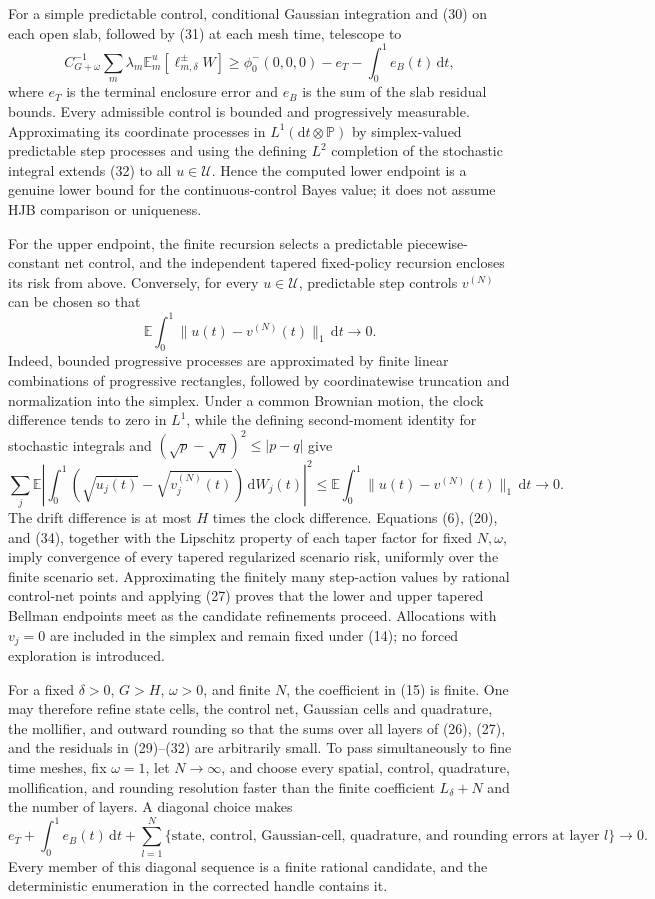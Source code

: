 For a simple predictable control, conditional Gaussian integration and (30) on each open slab, followed by (31) at each mesh time, telescope to
\[
 C_{G+\omega}^{-1}\sum_m\lambda_m
 \mathbb E_m^u[\ell_{m,\delta}^\pm W]
 \geq \phi_0^-(0,0,0)-e_T-\int_0^1e_B(t)\,\mathrm dt,
 \tag{32}
\]
where \(e_T\) is the terminal enclosure error and \(e_B\) is the sum of the slab residual bounds.  Every admissible control is bounded and progressively measurable.  Approximating its coordinate processes in \(L^1(\mathrm dt\otimes\mathbb P)\) by simplex-valued predictable step processes and using the defining \(L^2\) completion of the stochastic integral extends (32) to all \(u\in\mathcal U\).  Hence the computed lower endpoint is a genuine lower bound for the continuous-control Bayes value; it does not assume HJB comparison or uniqueness.

For the upper endpoint, the finite recursion selects a predictable piecewise-constant net control, and the independent tapered fixed-policy recursion encloses its risk from above.  Conversely, for every \(u\in\mathcal U\), predictable step controls \(v^{(N)}\) can be chosen so that
\[
 \mathbb E\int_0^1\|u(t)-v^{(N)}(t)\|_1\,\mathrm dt\longrightarrow0.
 \tag{33}
\]
Indeed, bounded progressive processes are approximated by finite linear combinations of progressive rectangles, followed by coordinatewise truncation and normalization into the simplex.  Under a common Brownian motion, the clock difference tends to zero in \(L^1\), while the defining second-moment identity for stochastic integrals and \((\sqrt p-\sqrt q)^2\leq|p-q|\) give
\[
 \sum_j\mathbb E\left|
 \int_0^1(\sqrt{u_j(t)}-\sqrt{v_j^{(N)}(t)})\,\mathrm dW_j(t)
 \right|^2
 \leq\mathbb E\int_0^1\|u(t)-v^{(N)}(t)\|_1\,\mathrm dt
 \longrightarrow0.
 \tag{34}
\]
The drift difference is at most \(H\) times the clock difference.  Equations (6), (20), and (34), together with the Lipschitz property of each taper factor for fixed \(N,\omega\), imply convergence of every tapered regularized scenario risk, uniformly over the finite scenario set.  Approximating the finitely many step-action values by rational control-net points and applying (27) proves that the lower and upper tapered Bellman endpoints meet as the candidate refinements proceed.  Allocations with \(v_j=0\) are included in the simplex and remain fixed under (14); no forced exploration is introduced.

For a fixed \(\delta>0\), \(G>H\), \(\omega>0\), and finite \(N\), the coefficient in (15) is finite.  One may therefore refine state cells, the control net, Gaussian cells and quadrature, the mollifier, and outward rounding so that the sums over all layers of (26), (27), and the residuals in (29)--(32) are arbitrarily small.  To pass simultaneously to fine time meshes, fix \(\omega=1\), let \(N\to\infty\), and choose every spatial, control, quadrature, mollification, and rounding resolution faster than the finite coefficient \(L_\delta+N\) and the number of layers.  A diagonal choice makes
\[
 e_T+\int_0^1e_B(t)\,\mathrm dt+
 \sum_{l=1}^N\{\text{state, control, Gaussian-cell, quadrature, and rounding errors at layer }l\}
 \longrightarrow0.
 \tag{35}
\]
Every member of this diagonal sequence is a finite rational candidate, and the deterministic enumeration in the corrected handle contains it.

